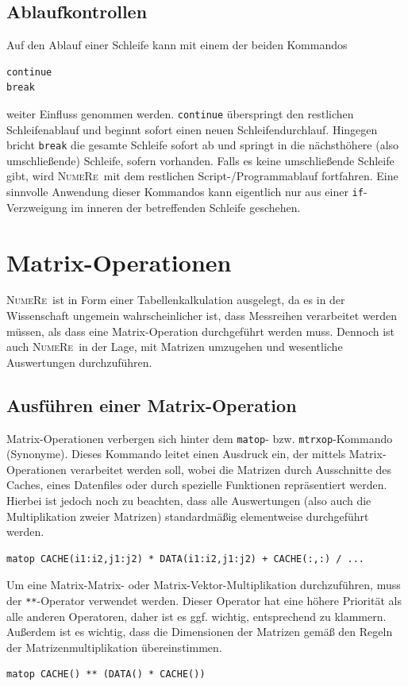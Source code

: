 \documentclass[DIV=14,headsepline,footsepline]{scrbook}
\newcommand{\NR}{\textsc{Nu\-me\-Re}}
\begin{document}
			\section{Ablaufkontrollen}
				Auf den Ablauf einer Schleife kann mit einem der beiden Kommandos
				\begin{lstlisting}
continue
break
				\end{lstlisting}
				weiter Einfluss genommen werden. \verb+continue+ überspringt den restlichen Schleifenablauf und beginnt sofort einen neuen Schleifendurchlauf. Hingegen bricht \verb+break+ die gesamte Schleife sofort ab und springt in die nächsthöhere (also umschließende) Schleife, sofern vorhanden. Falls es keine umschließende Schleife gibt, wird \NR\ mit dem restlichen Script-/Programmablauf fortfahren. Eine sinnvolle Anwendung dieser Kommandos kann eigentlich nur aus einer \verb+if+-Ver\-zwei\-gung im inneren der betreffenden Schleife geschehen.
				
		\chapter{Matrix-Operationen}
			\NR\ ist in Form einer Tabellenkalkulation ausgelegt, da es in der Wissenschaft ungemein wahrscheinlicher ist, dass Messreihen verarbeitet werden müssen, als dass eine Matrix-Operation durchgeführt werden muss. Dennoch ist auch \NR\ in der Lage, mit Matrizen umzugehen und wesentliche Auswertungen durchzuführen.
			\section{Ausführen einer Matrix-Operation}
				Matrix-Operationen verbergen sich hinter dem \verb+matop+- bzw. \verb+mtrxop+-Kommando (Synonyme). Dieses Kommando leitet einen Ausdruck ein, der mittels Matrix-Operationen verarbeitet werden soll, wobei die Matrizen durch Ausschnitte des Caches, eines Datenfiles oder durch spezielle Funktionen repräsentiert werden. Hierbei ist jedoch noch zu beachten, dass alle Auswertungen (also auch die Multiplikation zweier Matrizen) standardmäßig elementweise durchgeführt werden.
				\begin{lstlisting}
matop CACHE(i1:i2,j1:j2) * DATA(i1:i2,j1:j2) + CACHE(:,:) / ...
				\end{lstlisting}
				
				Um eine Matrix-Matrix- oder Matrix-Vektor-Multiplikation durchzuführen, muss der \verb+**+-O\-pe\-ra\-tor verwendet werden. Dieser Operator hat eine höhere Priorität als alle anderen Operatoren, daher ist es ggf. wichtig, entsprechend zu klammern. Außerdem ist es wichtig, dass die Dimensionen der Matrizen gemäß den Regeln der Matrizenmultiplikation übereinstimmen.
				\begin{lstlisting}
matop CACHE() ** (DATA() * CACHE())
				\end{lstlisting}
				
\end{document}
